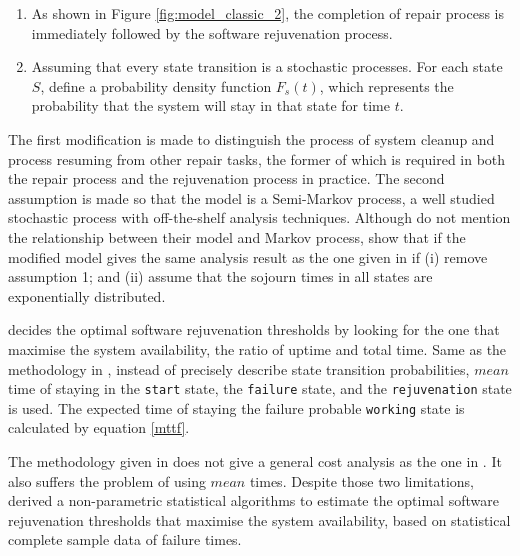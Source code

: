 \begin{enumerate}
  \item As shown in Figure \ref{fig:model_classic_2}, the completion of repair process
  is immediately followed by the software rejuvenation process.
  \item Assuming that every state transition is a stochastic processes.  For each state $S$, define a 
  probability density function $F_s(t)$, which represents the probability that the system will stay in that
  state for time $t$. 
\end{enumerate} 

The first modification is made to distinguish the process of system cleanup and process resuming
from other repair tasks, the former of which is required in both the repair process and the rejuvenation
process in practice.  The second assumption is made so that the model is a Semi-Markov process,
a well studied stochastic process with off-the-shelf analysis techniques.  Although \citet{huang1995software}
do not mention the relationship between their model and Markov process, \citet{dohi2000statistical}
show that if the modified model gives the same analysis result as the one
given in \citet{huang1995software} if (i) remove assumption 1; and (ii) assume 
that the sojourn times in all states are exponentially distributed.

\citet{dohi2000statistical} decides the optimal software rejuvenation thresholds by looking for
the one that maximise the system availability, the ratio of uptime and total time.  Same as the
methodology in \citet{huang1995software}, instead of precisely describe state transition 
probabilities, $mean$ time of staying in the {\tt start} state, the {\tt failure} state, and the
{\tt rejuvenation} state is used.  The expected time of staying the failure probable {\tt working} state
is calculated by equation \ref{mttf}.

The methodology given in \citet{dohi2000statistical}  does not give a general cost
analysis as the one in \citet{huang1995software}.  It also suffers the problem of using
$mean$ times.  Despite those two limitations, \citet{dohi2000statistical} 
derived a non-parametric statistical algorithms to estimate the optimal 
software rejuvenation thresholds that maximise the system availability, based 
on statistical complete sample data of failure times.



